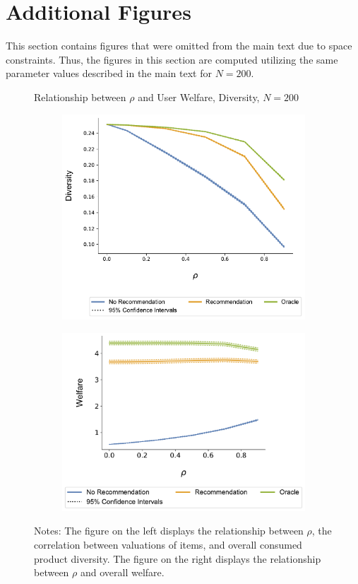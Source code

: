 \documentclass[format=acmsmall, review=true]{acmart}
\title[\PaperTitle]{\PaperTitle}
\begin{document}
\maketitle
\addtocounter{figure}{+4}
\section{Additional Figures}

This section contains figures that were omitted from the main text due to space constraints. Thus, the figures in this section are computed utilizing the same parameter values described in the main text for $N = 200$.

\begin{figure}[ht]
\caption{Relationship between $\rho$ and User Welfare, Diversity, $N = 200$}\label{fig:diversity_welfare_correlation}
\begin{subfigure}{.45\linewidth}
  \includegraphics[width=.8\linewidth]{figures/rho_diversity_N_200_T_20.pdf}
\end{subfigure}
\ContinuedFloat
\begin{subfigure}{.45\linewidth}
  \includegraphics[width=.8\linewidth]{figures/rho_welfare_N_200_T_20.pdf}
\end{subfigure}
\caption*{\scriptsize Notes: The figure on the left displays the relationship between $\rho$, the correlation between valuations of items, and overall consumed product diversity. The figure on the right displays the relationship between $\rho$ and overall welfare.}
\end{figure}
\end{document}
